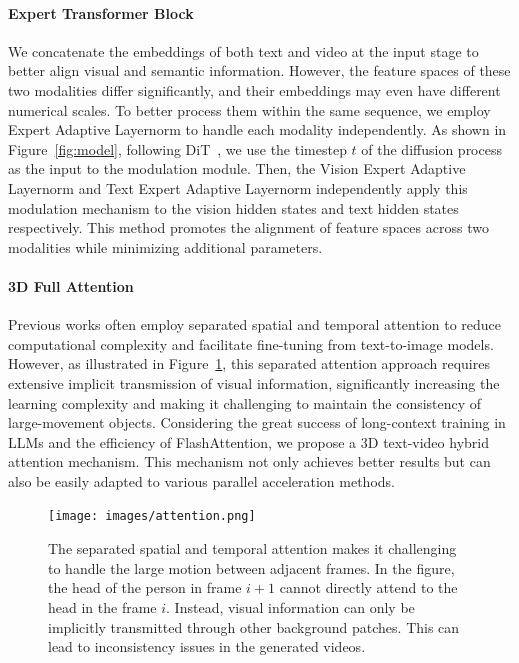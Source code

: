 \paragraph{Expert Transformer Block}
We concatenate the embeddings of both text and video at the input stage to better align visual and semantic information. However, the feature spaces of these two modalities differ significantly, and their embeddings may even have different numerical scales. To better process them within the same sequence, we employ Expert Adaptive Layernorm to handle each modality independently.
As shown in Figure~\ref{fig:model}, following DiT~\citep{peebles2023scalable}, we use the timestep $t$ of the diffusion process as the input to the modulation module. 
Then, the Vision Expert Adaptive Layernorm and Text Expert Adaptive Layernorm independently apply this modulation mechanism to the vision hidden states and text hidden states respectively. This method promotes the alignment of feature spaces across two modalities while minimizing additional parameters.



\paragraph{3D Full Attention}
Previous works \citep{singer2022make, guo2023animatediff} often employ separated spatial and temporal attention to reduce computational complexity and facilitate fine-tuning from text-to-image models. However, as illustrated in Figure~\ref{fig:attention}, this separated attention approach requires extensive implicit transmission of visual information, significantly increasing the learning complexity and making it challenging to maintain the consistency of large-movement objects. Considering the great success of long-context training in LLMs and the efficiency of FlashAttention, we propose a 3D text-video hybrid attention mechanism. This mechanism not only achieves better results but can also be easily adapted to various parallel acceleration methods. 


\begin{figure}
\centering
\texttt{[image: images/attention.png]}
\caption{The separated spatial and temporal attention makes it challenging to  handle the large motion between adjacent frames. In the figure, the head of the person in frame $i+1$ cannot directly attend to the head in the frame $i$. Instead, visual information can only be implicitly transmitted through other background patches. This can lead to inconsistency issues in the generated videos.}
\label{fig:attention}
\vspace{-10mm}
\end{figure}



